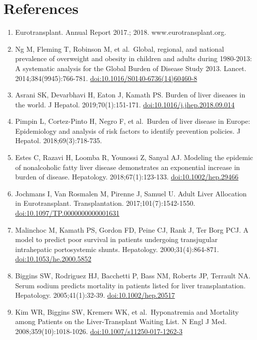 \documentclass[11pt,english,]{book} %
\providecommand{\tightlist}{%
  \setlength{\itemsep}{0pt}\setlength{\parskip}{0pt}}
\begin{document}
\newpage
\linespread{1}
\small

\hypertarget{references-1}{%
\section*{References}\label{references-1}}

\begin{enumerate}
\def\labelenumi{\arabic{enumi}.}
\tightlist
\item
  Eurotransplant. Annual Report 2017.; 2018. www.eurotransplant.org.
\item
  Ng M, Fleming T, Robinson M, et al.~Global, regional, and national prevalence of overweight and obesity in children and adults during 1980-2013: A systematic analysis for the Global Burden of Disease Study 2013. Lancet. 2014;384(9945):766-781. \url{doi:10.1016/S0140-6736(14)60460-8}
\item
  Asrani SK, Devarbhavi H, Eaton J, Kamath PS. Burden of liver diseases in the world. J Hepatol. 2019;70(1):151-171. \url{doi:10.1016/j.jhep.2018.09.014}
\item
  Pimpin L, Cortez-Pinto H, Negro F, et al.~Burden of liver disease in Europe: Epidemiology and analysis of risk factors to identify prevention policies. J Hepatol. 2018;69(3):718-735.
\item
  Estes C, Razavi H, Loomba R, Younossi Z, Sanyal AJ. Modeling the epidemic of nonalcoholic fatty liver disease demonstrates an exponential increase in burden of disease. Hepatology. 2018;67(1):123-133. \url{doi:10.1002/hep.29466}
\item
  Jochmans I, Van Rosmalen M, Pirenne J, Samuel U. Adult Liver Allocation in Eurotransplant. Transplantation. 2017;101(7):1542-1550. \url{doi:10.1097/TP.0000000000001631}
\item
  Malinchoc M, Kamath PS, Gordon FD, Peine CJ, Rank J, Ter Borg PCJ. A model to predict poor survival in patients undergoing transjugular intrahepatic portosystemic shunts. Hepatology. 2000;31(4):864-871. \url{doi:10.1053/he.2000.5852}
\item
  Biggins SW, Rodriguez HJ, Bacchetti P, Bass NM, Roberts JP, Terrault NA. Serum sodium predicts mortality in patients listed for liver transplantation. Hepatology. 2005;41(1):32-39. \url{doi:10.1002/hep.20517}
\item
  Kim WR, Biggins SW, Kremers WK, et al.~Hyponatremia and Mortality among Patients on the Liver-Transplant Waiting List. N Engl J Med. 2008;359(10):1018-1026. \url{doi:10.1007/s11250-017-1262-3}

\end{enumerate}
\end{document}
